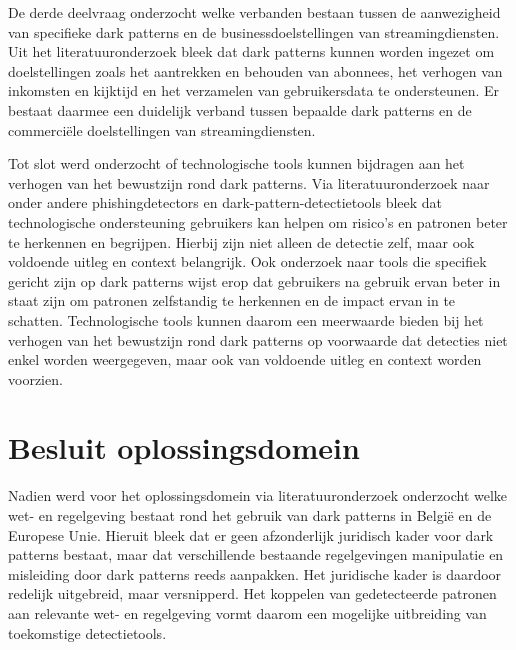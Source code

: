 \vspace{1em}

De derde deelvraag onderzocht welke verbanden bestaan tussen de aanwezigheid van specifieke dark patterns en de businessdoelstellingen van streamingdiensten. Uit het literatuuronderzoek bleek dat dark patterns kunnen worden ingezet om doelstellingen zoals het aantrekken en behouden van abonnees, het verhogen van inkomsten en kijktijd en het verzamelen van gebruikersdata te ondersteunen. Er bestaat daarmee een duidelijk verband tussen bepaalde dark patterns en de commerciële doelstellingen van streamingdiensten.

\vspace{1em}

Tot slot werd onderzocht of technologische tools kunnen bijdragen aan het verhogen van het bewustzijn rond dark patterns. Via literatuuronderzoek naar onder andere phishingdetectors en dark-pattern-detectietools bleek dat technologische ondersteuning gebruikers kan helpen om risico's en patronen beter te herkennen en begrijpen. Hierbij zijn niet alleen de detectie zelf, maar ook voldoende uitleg en context belangrijk. Ook onderzoek naar tools die specifiek gericht zijn op dark patterns wijst erop dat gebruikers na gebruik ervan beter in staat zijn om patronen zelfstandig te herkennen en de impact ervan in te schatten. Technologische tools kunnen daarom een meerwaarde bieden bij het verhogen van het bewustzijn rond dark patterns op voorwaarde dat detecties niet enkel worden weergegeven, maar ook van voldoende uitleg en context worden voorzien. 

\vspace{1em}

\section{Besluit oplossingsdomein}
\label{sec:besluit-oplossingsdomein}

\vspace{1em}

Nadien werd voor het oplossingsdomein via literatuuronderzoek onderzocht welke wet- en regelgeving bestaat rond het gebruik van dark patterns in België en de Europese Unie. Hieruit bleek dat er geen afzonderlijk juridisch kader voor dark patterns bestaat, maar dat verschillende bestaande regelgevingen manipulatie en misleiding door dark patterns reeds aanpakken. Het juridische kader is daardoor redelijk uitgebreid, maar versnipperd. Het koppelen van gedetecteerde patronen aan relevante wet- en regelgeving vormt daarom een mogelijke uitbreiding van toekomstige detectietools.

